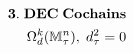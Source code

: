 \documentclass[preview]{standalone}
\begin{document}
\begin{align*}
\special{dvisvgm:raw <g id='unique000'>}\mathbf{3.\;DEC\;Cochains}\\\Omega_d^k(\mathbb{M}_\tau^n),\;d_\tau^2 = 0\special{dvisvgm:raw </g>}
\end{align*}
\end{document}
